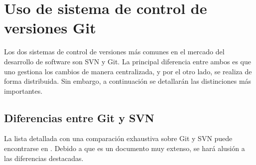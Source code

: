 %
%

\chapter[Uso de Git y diferencias con Subversion]{
	Uso de sistema de control de versiones Git
	\label{ap:git}
}

Los dos sistemas de control de versiones más comunes en el mercado del desarrollo de software son SVN y Git. La principal diferencia entre ambos es que uno gestiona los cambios de manera centralizada, y por el otro lado, se realiza de forma distribuida. Sin embargo, a continuación se detallarán las distinciones más importantes.

%
%
\section{Diferencias entre Git y SVN \label{sec:git_vs_svn}}

La lista detallada con una comparación exhaustiva sobre Git y SVN puede encontrarse en \cite{svnvsgit}. Debido a que es un documento muy extenso, se hará alusión a las diferencias destacadas.

